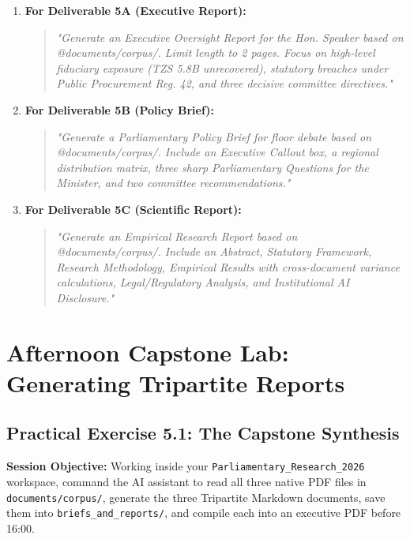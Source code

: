 \documentclass[11pt, a4paper]{report}
\begin{document}
\begin{enumerate}[label=\textbf{\arabic*.}]
    \item \textbf{For Deliverable 5A (Executive Report):}
    \begin{quote}
        \small\textit{"Generate an Executive Oversight Report for the Hon. Speaker based on @documents/corpus/. Limit length to 2 pages. Focus on high-level fiduciary exposure (TZS 5.8B unrecovered), statutory breaches under Public Procurement Reg. 42, and three decisive committee directives."}
    \end{quote}
    \item \textbf{For Deliverable 5B (Policy Brief):}
    \begin{quote}
        \small\textit{"Generate a Parliamentary Policy Brief for floor debate based on @documents/corpus/. Include an Executive Callout box, a regional distribution matrix, three sharp Parliamentary Questions for the Minister, and two committee recommendations."}
    \end{quote}
    \item \textbf{For Deliverable 5C (Scientific Report):}
    \begin{quote}
        \small\textit{"Generate an Empirical Research Report based on @documents/corpus/. Include an Abstract, Statutory Framework, Research Methodology, Empirical Results with cross-document variance calculations, Legal/Regulatory Analysis, and Institutional AI Disclosure."}
    \end{quote}
\end{enumerate}

\vspace{1.5em}
\noindent{}
\vspace{1.5em}

\newpage

\chapter{Afternoon Capstone Lab: Generating Tripartite Reports}

\section{Practical Exercise 5.1: The Capstone Synthesis}
\textbf{Session Objective:} Working inside your \texttt{Parliamentary\_Research\_2026} workspace, command the AI assistant to read all three native PDF files in \texttt{documents/corpus/}, generate the three Tripartite Markdown documents, save them into \texttt{briefs\_and\_reports/}, and compile each into an executive PDF before 16:00.
\end{document}
